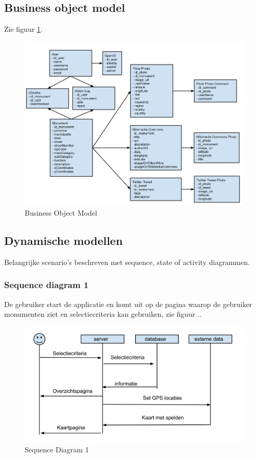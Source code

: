 \documentclass[a4paper,10pt]{article}
\begin{document}
	\subsection{Business object model}
		Zie figuur \ref{bom}.
		\begin{figure}[ht!]
			\centering
			\includegraphics[width=\textwidth]{BusinessObjectModel.png}
			\caption{Business Object Model \label{bom}}
		\end{figure}
		\subsection{Dynamische modellen}
			Belangrijke scenario's beschreven met sequence, state of activity diagrammen.
			\subsubsection{Sequence diagram 1}
			De gebruiker start de applicatie en komt uit op de pagina waarop de gebruiker monumenten ziet en selectiecriteria kan gebruiken, zie figuur .. %
			\begin{figure}[ht!]
				\centering
				\includegraphics[width=\textwidth]{sequence1.png}
				\caption{Sequence Diagram 1 \label{sequence1}}
			\end{figure}
\end{document}
